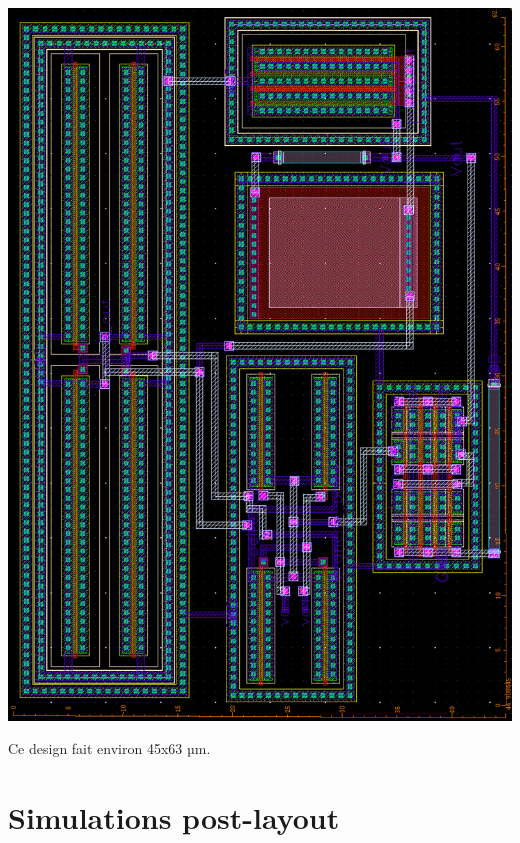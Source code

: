 \documentclass{article}
\begin{document}
\includegraphics[width=\linewidth-0.25cm]{layout_cadence.png}

Ce design fait environ 45x63 µm.

\newpage

\section{Simulations post-layout}

\end{document}
